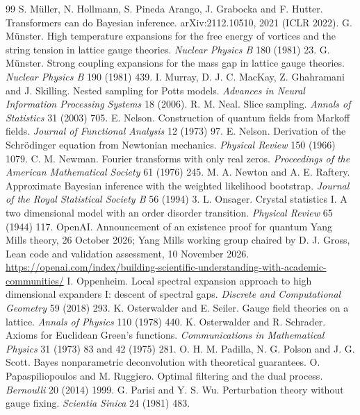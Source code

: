 \begin{thebibliography}{99}
 S. M\"uller, N. Hollmann, S. Pineda Arango, J. Grabocka and F. Hutter. Transformers can do Bayesian inference. arXiv:2112.10510, 2021 (ICLR 2022).
 G. M\"unster. High temperature expansions for the free energy of vortices and the string tension in lattice gauge theories. \emph{Nuclear Physics B} 180 (1981) 23.
 G. M\"unster. Strong coupling expansions for the mass gap in lattice gauge theories. \emph{Nuclear Physics B} 190 (1981) 439.
 I. Murray, D. J. C. MacKay, Z. Ghahramani and J. Skilling. Nested sampling for Potts models. \emph{Advances in Neural Information Processing Systems} 18 (2006).
 R. M. Neal. Slice sampling. \emph{Annals of Statistics} 31 (2003) 705.
 E. Nelson. Construction of quantum fields from Markoff fields. \emph{Journal of Functional Analysis} 12 (1973) 97.
 E. Nelson. Derivation of the Schr\"odinger equation from Newtonian mechanics. \emph{Physical Review} 150 (1966) 1079.
 C. M. Newman. Fourier transforms with only real zeros. \emph{Proceedings of the American Mathematical Society} 61 (1976) 245.
 M. A. Newton and A. E. Raftery. Approximate Bayesian inference with the weighted likelihood bootstrap. \emph{Journal of the Royal Statistical Society B} 56 (1994) 3.
 L. Onsager. Crystal statistics I. A two dimensional model with an order disorder transition. \emph{Physical Review} 65 (1944) 117.
 OpenAI. Announcement of an existence proof for quantum Yang Mills theory, 26 October 2026; Yang Mills working group chaired by D. J. Gross, Lean code and validation assessment, 10 November 2026. \url{https://openai.com/index/building-scientific-understanding-with-academic-communities/}
 I. Oppenheim. Local spectral expansion approach to high dimensional expanders I: descent of spectral gaps. \emph{Discrete and Computational Geometry} 59 (2018) 293.
 K. Osterwalder and E. Seiler. Gauge field theories on a lattice. \emph{Annals of Physics} 110 (1978) 440.
 K. Osterwalder and R. Schrader. Axioms for Euclidean Green's functions. \emph{Communications in Mathematical Physics} 31 (1973) 83 and 42 (1975) 281.
 O. H. M. Padilla, N. G. Polson and J. G. Scott. Bayes nonparametric deconvolution with theoretical guarantees.
 O. Papaspiliopoulos and M. Ruggiero. Optimal filtering and the dual process. \emph{Bernoulli} 20 (2014) 1999.
 G. Parisi and Y. S. Wu. Perturbation theory without gauge fixing. \emph{Scientia Sinica} 24 (1981) 483.

\end{thebibliography}
